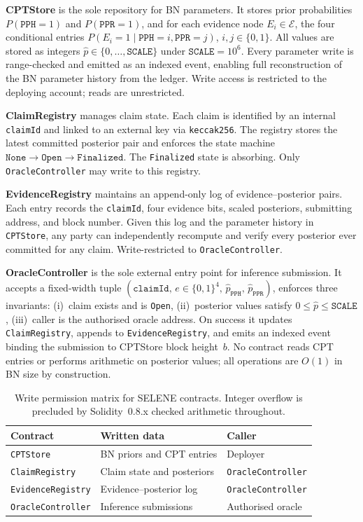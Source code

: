 \documentclass[journal]{IEEEtran}
\begin{document}
\textbf{CPTStore} is the sole repository for BN
parameters. It stores prior probabilities
$P(\texttt{PPH}=1)$ and $P(\texttt{PPR}=1)$, and for
each evidence node $E_i\in\mathcal{E}$, the four
conditional entries
$P(E_i=1\mid\texttt{PPH}=i,\texttt{PPR}=j)$,
$i,j\in\{0,1\}$. All values are stored as integers
$\widehat{p}\in\{0,\dots,\texttt{SCALE}\}$ under
$\texttt{SCALE}=10^6$. Every parameter write is
range-checked and emitted as an indexed event,
enabling full reconstruction of the BN parameter
history from the ledger. Write access is restricted
to the deploying account; reads are unrestricted.

\textbf{ClaimRegistry} manages claim state. Each
claim is identified by an internal \texttt{claimId}
and linked to an external key via \texttt{keccak256}.
The registry stores the latest committed posterior
pair and enforces the state machine
$\texttt{None}\to\texttt{Open}\to\texttt{Finalized}$.
The \texttt{Finalized} state is absorbing. Only
\texttt{OracleController} may write to this registry.

\textbf{EvidenceRegistry} maintains an append-only
log of evidence--posterior pairs. Each entry records
the \texttt{claimId}, four evidence bits, scaled
posteriors, submitting address, and block number.
Given this log and the parameter history in
\texttt{CPTStore}, any party can independently
recompute and verify every posterior ever committed
for any claim. Write-restricted to
\texttt{OracleController}.

\textbf{OracleController} is the sole external entry
point for inference submission. It accepts a
fixed-width tuple
$(\texttt{claimId},\,e\in\{0,1\}^4,\,
\widehat{p}_{\texttt{PPH}},\,
\widehat{p}_{\texttt{PPR}})$, enforces three
invariants: (i)~claim exists and is \texttt{Open},
(ii)~posterior values satisfy
$0\leq\widehat{p}\leq\texttt{SCALE}$,
(iii)~caller is the authorised oracle address.
On success it updates \texttt{ClaimRegistry}, appends
to \texttt{EvidenceRegistry}, and emits an indexed
event binding the submission to CPTStore block
height~$b$. No contract reads CPT entries or performs
arithmetic on posterior values; all operations are
$O(1)$ in BN size by construction.

\begin{table}[t]
\centering
\caption{Write permission matrix for SELENE contracts.
Integer overflow is precluded by Solidity~0.8.x
checked arithmetic throughout.}
\label{tab:access-control}
\begin{tabularx}{\columnwidth}{lXl}
\toprule
\textbf{Contract} &
\textbf{Written data} &
\textbf{Caller} \\
\midrule
\texttt{CPTStore}
  & BN priors and CPT entries
  & Deployer \\
\texttt{ClaimRegistry}
  & Claim state and posteriors
  & \texttt{OracleController} \\
\texttt{EvidenceRegistry}
  & Evidence--posterior log
  & \texttt{OracleController} \\
\texttt{OracleController}
  & Inference submissions
  & Authorised oracle \\
\bottomrule
\end{tabularx}
\end{table}
\end{document}
